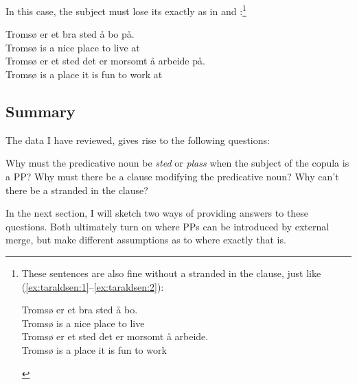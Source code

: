 \documentclass[output=paper]{LSP/langsci}
\begin{document}
\ea%
    \label{ex:taraldsen:15}
\z
\z

In this case, the subject must lose its  exactly as in  and :\footnote{These sentences are also fine without a stranded  in the  clause, just like (\ref{ex:taraldsen:1}--\ref{ex:taraldsen:2}):

\begin{xlist}
 \begin{xlista}
 \ex \gll Tromsø er et bra sted å bo.\\
	  Tromsø is a nice place to live\\
 \ex \gll Tromsø er et sted det er morsomt å arbeide.\\
	  Tromsø is a place it is fun to work\\
 \end{xlista}
\end{xlist}
}

\ea
\label{ex:taraldsen:16}
\ea \gll Tromsø er et bra sted å bo på.\\
          Tromsø is a nice place to live at\\
\ex \gll Tromsø er et sted det er morsomt å arbeide på.\\
         Tromsø is  a place it  is  fun         to work    at\\
\z\z
\subsection{Summary}\label{sec:taraldsen:2.5}

The data I have reviewed, gives rise to the following questions:

\ea%
    \label{ex:taraldsen:17}
    \ea\label{ex:taraldsen:17a} Why must the predicative noun be \textit{sted} or \textit{plass} when the subject of the copula is a PP?
    \ex\label{ex:taraldsen:17b} Why must there be a  clause modifying the predicative noun?
    \ex\label{ex:taraldsen:17c} Why can’t there be a stranded  in the  clause?
    \z
\z

In the next section, I will sketch two ways of providing answers to these questions. Both ultimately turn on where PPs can be introduced by external merge, but make different assumptions as to where exactly that is.
\end{document}
